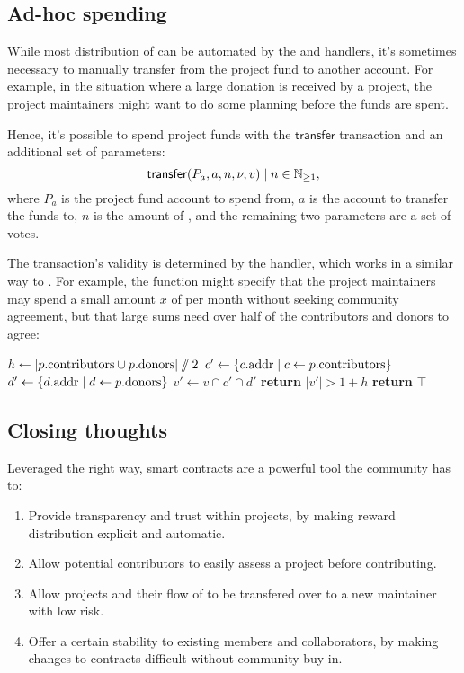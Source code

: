 \subsection{Ad-hoc spending}

While most distribution of \oscoin{} can be automated by the 
and  handlers, it's sometimes necessary to manually
transfer \oscoin{} from the project fund to another account. For example, in
the situation where a large donation is received by a project, the project
maintainers might want to do some planning before the funds are spent.

Hence, it's possible to spend project funds with the $\mathsf{transfer}$
transaction and an additional set of parameters:
\[
    \mathsf{transfer}\lparen P_a, a, n, \nu, v\rparen \mid n \in \mathbb{N}_{\geq 1},
\]
where $P_a$ is the project fund account to spend from, $a$ is the account to
transfer the funds to, $n$ is the amount of \oscoin{}, and the remaining two
parameters are a set of votes.

The transaction's validity is determined by the  handler,
which works in a similar way to . For
example, the function might specify that the project maintainers may spend a small
amount $x$ of \oscoin{} per month without seeking community agreement, but that
large sums need over half of the contributors and donors to agree:
\medskip
\begin{algorithmic}[0]
            \State $h \gets |p.{\mathrm{contributors}} \cup p.{\mathrm{donors}}| \sslash 2$
            \State $c' \gets \{ c.{\mathrm{addr}} \mid c \gets p.{\mathrm{contributors}} \}$
            \State $d' \gets \{ d.{\mathrm{addr}} \mid d \gets p.{\mathrm{donors}} \}$
            \State $v' \gets v \cap c' \cap d'$
            \State \textbf{return} $|v'| > 1 + h$
            \Else
            \State \textbf{return} $\top$
        \EndIf
    \EndProcedure
\end{algorithmic}

\subsection{Closing thoughts}

Leveraged the right way, smart contracts are a powerful tool the community has
to:

\begin{enumerate}
    \item Provide transparency and trust within projects, by making reward
        distribution explicit and automatic.
    \item Allow potential contributors to easily assess a project before contributing.
    \item Allow projects and their flow of \oscoin{} to be transfered over to a
        new maintainer with low risk.
    \item Offer a certain stability to existing members and collaborators, by
        making changes to contracts difficult without community buy-in.
\end{enumerate}
